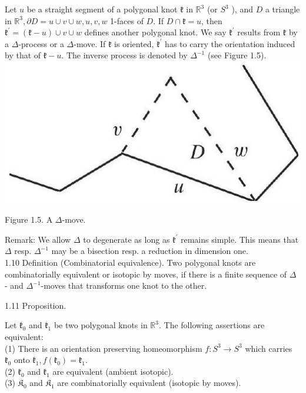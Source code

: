 \documentclass[10pt, letterpaper]{article}
\begin{document}
Let $u$ be a straight segment of a polygonal knot $\mathfrak{k}$ in $\mathbb{R}^{3}$ (or $S^{3}$ ), and $D$ a triangle in $\mathbb{R}^{3}, \partial D=u \cup v \cup w, u, v, w$ 1-faces of $D$. If $D \cap \mathfrak{k}=u$, then $\mathfrak{k}^{\prime}=(\mathfrak{k}-u) \cup v \cup w$ defines another polygonal knot. We say $\mathfrak{k}^{\prime}$ results from $\mathfrak{k}$ by a $\Delta$-process or a $\Delta$-move. If $\mathfrak{k}$ is oriented, $\mathfrak{k}^{\prime}$ has to carry the orientation induced by that of $\mathfrak{k}-u$. The inverse process is denoted by $\Delta^{-1}$ (see Figure 1.5).\\
\includegraphics[scale=0.2, center]{2025_05_21_9c06be8de7a55410f8c1g-021}

Figure 1.5. A $\Delta$-move.

Remark: We allow $\Delta$ to degenerate as long as $\mathfrak{k}^{\prime}$ remains simple. This means that $\Delta$ resp. $\Delta^{-1}$ may be a bisection resp. a reduction in dimension one.\\
1.10 Definition (Combinatorial equivalence). Two polygonal knots are combinatorially equivalent or isotopic by moves, if there is a finite sequence of $\Delta$ - and $\Delta^{-1}$-moves that transforms one knot to the other.

1.11 Proposition. 

Let $\mathfrak{k}_{0}$ and $\mathfrak{k}_{1}$ be two polygonal knots in $\mathbb{R}^{3}$. The following assertions are equivalent:\\
(1) There is an orientation preserving homeomorphism $f: S^{3} \rightarrow S^{3}$ which carries $\mathfrak{k}_{0}$ onto $\mathfrak{k}_{1}, f\left(\mathfrak{k}_{0}\right)=\mathfrak{k}_{1}$.\\
(2) $\mathfrak{k}_{0}$ and $\mathfrak{k}_{1}$ are equivalent (ambient isotopic).\\
(3) $\mathfrak{K}_{0}$ and $\mathfrak{K}_{1}$ are combinatorially equivalent (isotopic by moves).
\end{document}
